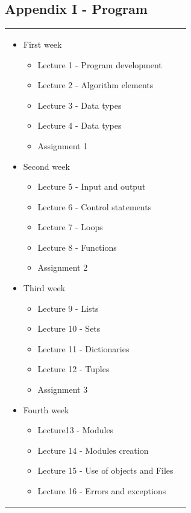 \documentclass[letter, 10pt]{article}
\begin{document}
\subsection{Appendix I - Program}
\label{cap:program}
\begin{footnotesize}
\begin{tabular}{p{}p{}}

\begin{itemize}
    \item First week
    \begin{itemize}
        \item Lecture 1 - Program development
        \item Lecture 2 - Algorithm elements
        \item Lecture 3 - Data types
        \item Lecture 4 - Data types
        \item Assignment 1
    \end{itemize}
    \item Second week
    \begin{itemize}
        \item Lecture 5 - Input and output
        \item Lecture 6 - Control statements
        \item Lecture 7 - Loops
        \item Lecture 8 - Functions
        \item Assignment 2
    \end{itemize}
    \item Third week
    \begin{itemize}
        \item Lecture 9 - Lists
        \item Lecture 10 - Sets
        \item Lecture 11 - Dictionaries
        \item Lecture 12 - Tuples
        \item Assignment 3
    \end{itemize}
    \item Fourth week
    \begin{itemize}
        \item Lecture13 - Modules
        \item Lecture 14 - Modules creation
        \item Lecture 15 - Use of objects and Files
        \item Lecture 16 - Errors and exceptions

\end{itemize}
\end{itemize}
\end{tabular}
\end{footnotesize}
\end{document}
